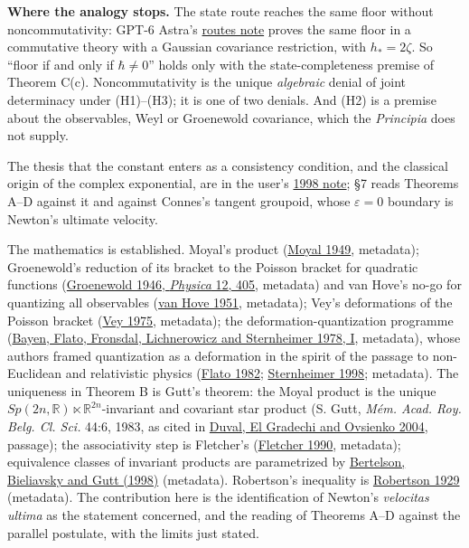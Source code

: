 \documentclass[11pt,a4paper]{article}
\begin{document}
\textbf{Where the analogy stops.} The state route reaches the same floor
without noncommutativity: GPT-6 Astra's
\href{newton-indeterminacy-routes.md}{routes note} proves the same floor
in a commutative theory with a Gaussian covariance restriction, with
\(h_*=2\zeta\). So ``floor if and only if \(\hbar\ne0\)'' holds only
with the state-completeness premise of Theorem C(c). Noncommutativity is
the unique \emph{algebraic} denial of joint determinacy under
(H1)--(H3); it is one of two denials. And (H2) is a premise about the
observables, Weyl or Groenewold covariance, which the \emph{Principia}
does not supply.

The thesis that the constant enters as a consistency condition, and the
classical origin of the complex exponential, are in the user's
\href{https://arxiv.org/abs/quant-ph/9803035}{1998 note}; §7 reads
Theorems A--D against it and against Connes's tangent groupoid, whose
\(\varepsilon=0\) boundary is Newton's ultimate velocity.

The mathematics is established. Moyal's product
(\href{https://doi.org/10.1017/S0305004100000487}{Moyal 1949},
metadata); Groenewold's reduction of its bracket to the Poisson bracket
for quadratic functions
(\href{https://doi.org/10.1016/S0031-8914(46)80059-4}{Groenewold 1946,
\emph{Physica} 12, 405}, metadata) and van Hove's no-go for quantizing
all observables (\href{https://doi.org/10.3406/barb.1951.70660}{van Hove
1951}, metadata); Vey's deformations of the Poisson bracket
(\href{https://doi.org/10.1007/BF02565761}{Vey 1975}, metadata); the
deformation-quantization programme
(\href{https://doi.org/10.1016/0003-4916(78)90224-5}{Bayen, Flato,
Fronsdal, Lichnerowicz and Sternheimer 1978, I}, metadata), whose
authors framed quantization as a deformation in the spirit of the
passage to non-Euclidean and relativistic physics
(\href{https://doi.org/10.1007/BF01596202}{Flato 1982};
\href{https://doi.org/10.1063/1.57093}{Sternheimer 1998}; metadata). The
uniqueness in Theorem B is Gutt's theorem: the Moyal product is the
unique \(Sp(2n,\mathbb R)\ltimes\mathbb R^{2n}\)-invariant and covariant
star product (S. Gutt, \emph{Mém. Acad. Roy. Belg. Cl. Sci.} 44:6, 1983,
as cited in \href{https://doi.org/10.1007/s00220-003-0973-7}{Duval, El
Gradechi and Ovsienko 2004}, passage); the associativity step is
Fletcher's (\href{https://doi.org/10.1016/0370-2693(90)90300-U}{Fletcher
1990}, metadata); equivalence classes of invariant products are
parametrized by
\href{https://doi.org/10.1023/A:1007598606137}{Bertelson, Bieliavsky and
Gutt (1998)} (metadata). Robertson's inequality is
\href{https://doi.org/10.1103/PhysRev.34.163}{Robertson 1929}
(metadata). The contribution here is the identification of Newton's
\emph{velocitas ultima} as the statement concerned, and the reading of
Theorems A--D against the parallel postulate, with the limits just
stated.
\end{document}
